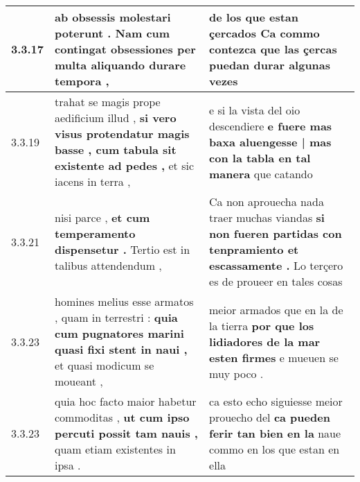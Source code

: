 \begin{tabular}{|p{1cm}|p{6.5cm}|p{6.5cm}|}
3.3.17 & ab obsessis molestari poterunt . \textbf{ Nam cum contingat obsessiones } per multa aliquando durare tempora , & de los que estan çercados \textbf{ Ca commo contezca } que las çercas puedan durar algunas vezes \\\hline
3.3.19 & trahat se magis prope aedificium illud , \textbf{ si vero visus protendatur magis basse , cum tabula sit existente ad pedes , } et sic iacens in terra , & e si la vista del oio descendiere \textbf{ e fuere mas baxa aluengesse | mas con la tabla en tal manera } que catando \\\hline
3.3.21 & nisi parce , \textbf{ et cum temperamento dispensetur . } Tertio est in talibus attendendum , & Ca non aprouecha nada traer muchas viandas \textbf{ si non fueren partidas con tenpramiento et escassamente . } Lo terçero es de proueer en tales cosas \\\hline
3.3.23 & homines melius esse armatos , quam in terrestri : \textbf{ quia cum pugnatores marini quasi fixi stent in naui , } et quasi modicum se moueant , & meior armados que en la de la tierra \textbf{ por que los lidiadores de la mar esten firmes } e mueuen se muy poco . \\\hline
3.3.23 & quia hoc facto maior habetur commoditas , \textbf{ ut cum ipso percuti possit tam nauis , } quam etiam existentes in ipsa . & ca esto echo siguiesse meior prouecho del \textbf{ ca pueden ferir tan bien en la } naue commo en los que estan en ella \\\hline

\end{tabular}
